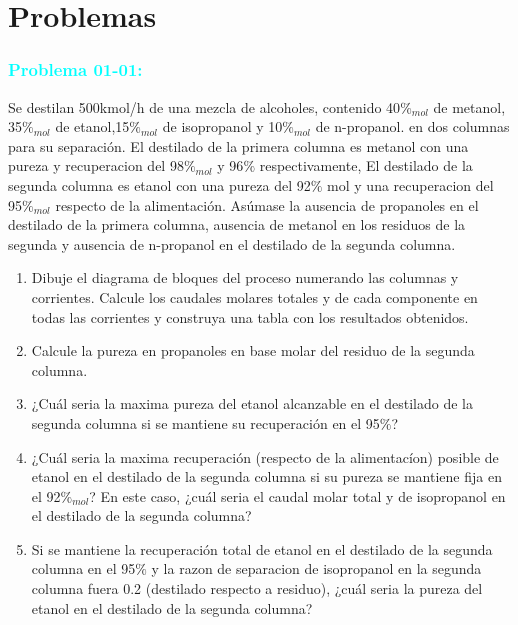 \documentclass{report}
\begin{document}
\section{Problemas}
\begin{raggedright}
	\subsubsection{\textbf{\textcolor{cyan}{Problema 01-01:}}}
	Se destilan 500kmol/h de una mezcla de alcoholes, contenido 40$\% _{mol}$ de metanol, 35$\% _{mol}$ de etanol,15$\% _{mol}$ de isopropanol y 10$\% _{mol}$ de n-propanol.
		en dos columnas para su separación. El destilado de la primera columna es metanol con una pureza y recuperacion del 98$\% _{mol}$ y 96$\%$ respectivamente, 
		El destilado de la segunda columna es etanol con una pureza del 92$\%$ mol y una recuperacion del 95$\% _{mol}$ respecto de la alimentación. Asúmase la ausencia de propanoles en el destilado de la primera columna, ausencia de metanol en los residuos de la segunda y ausencia de n-propanol en el destilado de la segunda columna.
	\begin{enumerate}[label=\textbf{\alph*)}]
		\item Dibuje el diagrama de bloques del proceso numerando las columnas y corrientes. Calcule los caudales molares totales y de cada componente en todas las corrientes y construya una tabla con los resultados obtenidos.
		\item Calcule la pureza en propanoles en base molar del residuo de la segunda columna.
		\item ¿Cuál seria la maxima pureza del etanol alcanzable en el destilado de la segunda columna si se mantiene su recuperación en el 95$\%$?
		\item ¿Cuál seria la maxima recuperación (respecto de la alimentacíon) posible de etanol en el destilado de la segunda columna si su pureza se mantiene fija en el 92$\% _{mol}$? En este caso, ¿cuál seria el caudal molar total y de isopropanol en el destilado de la segunda columna?
		\item Si se mantiene la recuperación total de etanol en el destilado de la segunda columna en el 95$\%$ y la razon de separacion de isopropanol en la segunda columna fuera 0.2 (destilado respecto a residuo), ¿cuál seria la pureza del etanol en el destilado de la segunda columna?
	\end{enumerate}
\sol


\end{raggedright}
\end{document}
